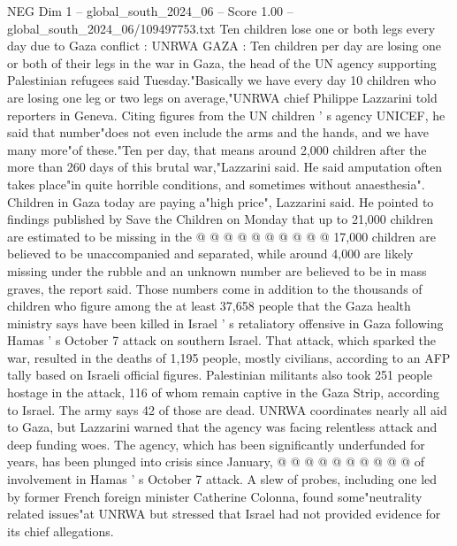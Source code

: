 \begin{textsample}{NEG Dim 1 – global\_south\_2024\_06 – Score 1.00 – global\_south\_2024\_06/109497753.txt}  \label{ex:f1_neg_324}
Ten children lose one or both legs every day due to Gaza conflict : UNRWA GAZA : Ten children per day are losing one or both of their legs in the war in Gaza, the head of the UN agency supporting Palestinian refugees said Tuesday."Basically we have every day 10 children who are losing one leg or two legs on average,"UNRWA chief Philippe Lazzarini told reporters in Geneva.
Citing figures from the UN children ' s agency UNICEF, he said that number"does not even include the arms and the hands, and we have many more"of these."Ten per day, that means around 2,000 children after the more than 260 days of this brutal war,"Lazzarini said.
He said amputation often takes place"in quite horrible conditions, and sometimes without anaesthesia".
Children in Gaza today are paying a"high price", Lazzarini said.
He pointed to findings published by Save the Children on Monday that up to 21,000 children are estimated to be missing in the @ @ @ @ @ @ @ @ @ @ 17,000 children are believed to be unaccompanied and separated, while around 4,000 are likely missing under the rubble and an unknown number are believed to be in mass graves, the report said.
Those numbers come in addition to the thousands of children who figure among the at least 37,658 people that the Gaza health ministry says have been killed in Israel ' s retaliatory offensive in Gaza following Hamas ' s October 7 attack on southern Israel.
That attack, which sparked the war, resulted in the deaths of 1,195 people, mostly civilians, according to an AFP tally based on Israeli official figures.
Palestinian militants also took 251 people hostage in the attack, 116 of whom remain captive in the Gaza Strip, according to Israel.
The army says 42 of those are dead.
UNRWA coordinates nearly all aid to Gaza, but Lazzarini warned that the agency was facing relentless attack and deep funding woes.
The agency, which has been significantly underfunded for years, has been plunged into crisis since January, @ @ @ @ @ @ @ @ @ @ of involvement in Hamas ' s October 7 attack.
A slew of probes, including one led by former French foreign minister Catherine Colonna, found some"neutrality related issues"at UNRWA but stressed that Israel had not provided evidence for its chief allegations.

\end{textsample}
